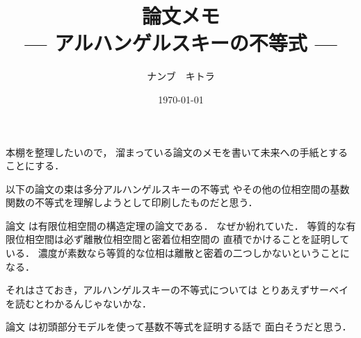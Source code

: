 \documentclass[leqno, a4paper, 12pt]{jsarticle}
\title{論文メモ
\large{\\--- アルハンゲルスキーの不等式 ---}
}
\author{ナンブ　キトラ}
\date{\today}
\begin{document}
\maketitle

本棚を整理したいので，
溜まっている論文のメモを書いて未来への手紙とすることにする．

以下の論文の束は多分アルハンゲルスキーの不等式
やその他の位相空間の基数関数の不等式を理解しようとして印刷したものだと思う．

論文
\cite{ginsburg1983}
は有限位相空間の構造定理の論文である．
なぜか紛れていた．
等質的な有限位相空間は必ず離散位相空間と密着位相空間の
直積でかけることを証明している．
濃度が素数なら等質的な位相は離散と密着の二つしかないということになる．

それはさておき，アルハンゲルスキーの不等式については
とりあえずサーベイ\cite{HODEL20062199}
を読むとわかるんじゃないかな．

論文
\cite{fedeli1995elementary}
は初頭部分モデルを使って基数不等式を証明する話で
面白そうだと思う．


\nocite{*}


\end{document}
